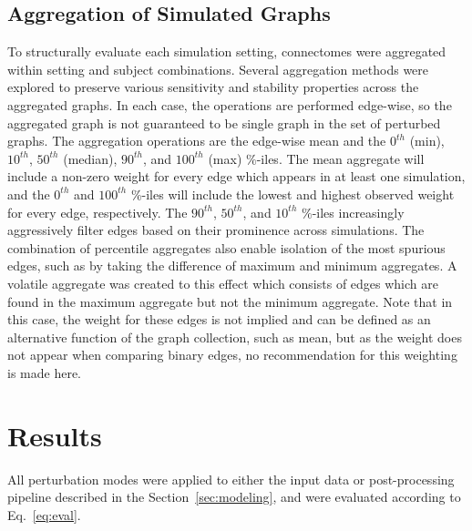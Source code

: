 \documentclass[fleqn,12pt]{SelfArx_ch} %
\begin{document}
\subsection{Aggregation of Simulated Graphs}
To structurally evaluate each simulation setting, connectomes were aggregated within setting and subject combinations.
Several aggregation methods were explored to preserve various sensitivity and stability properties across the
aggregated graphs. In each case, the operations are performed edge-wise, so the aggregated graph is not guaranteed to
be single graph in the set of perturbed graphs. The aggregation operations are the edge-wise mean and the $0^{th}$
(min), $10^{th}$, $50^{th}$ (median), $90^{th}$, and $100^{th}$ (max) $\%$-iles. The mean aggregate will include a
non-zero weight for every edge which appears in at least one simulation, and the $0^{th}$ and $100^{th}$ \%-iles will
include the lowest and highest observed weight for every edge, respectively. The $90^{th}$, $50^{th}$, and $10^{th}$
\%-iles increasingly aggressively filter edges based on their prominence across simulations. The combination of
percentile aggregates also enable isolation of the most spurious edges, such as by taking the difference of maximum and
minimum aggregates. A volatile aggregate was created to this effect which consists of edges which are found in the
maximum aggregate but not the minimum aggregate. Note that in this case, the weight for these edges is not implied and
can be defined as an alternative function of the graph collection, such as mean, but as the weight does not appear when
comparing binary edges, no recommendation for this weighting is made here.

\section{Results}
\label{sec:res}
All perturbation modes were applied to either the input data or post-processing pipeline described in the
Section~\ref{sec:modeling}, and were evaluated according to Eq.~\eqref{eq:eval}.
\end{document}
